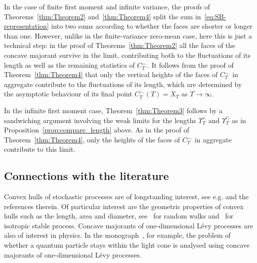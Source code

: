 \documentclass[AHL,Unicode,longabstracts,published]{cedram}
\newcommand\1{\mathds{1}}
\begin{document}
In the case of finite first moment and infinite variance, the proofs of Theorems~\ref{thm:Theorem2} and~\ref{thm:Theorem4} split the sum in~\eqref{eq:SB-representation} into two sums according to whether the faces are shorter or longer than one. However, unlike in the finite-variance zero-mean case, here this is just a technical step: in the proof of Theorems~\ref{thm:Theorem2} all the faces of the concave majorant survive in the limit, contributing both to the fluctuations of its length as well as the remaining statistics of $C_T^\frown$. It follows from the proof of Theorem~\ref{thm:Theorem4} that only the vertical heights of the faces of $C_T^\frown$ in aggregate contribute to the fluctuations of its length, which are determined by the asymptotic behaviour of its final point $C_T^\frown(T)=X_T$ as $T\to\infty$.

In the infinite first moment case, Theorem~\ref{thm:Theorem3} follows by a sandwiching argument involving the weak limits for the lengths $\Upsilon_T^\wedge$ and $\Upsilon_T^\sqcap$ as in Proposition~\ref{prop:compare_length} above. As in the proof of Theorem~\ref{thm:Theorem4}, only the heights of the faces of $C_T^\frown$ in aggregate contribute to this limit.

\subsection{Connections with the literature}\label{subsec:lit}
Convex hulls of stochastic processes are of longstanding interest, see e.g.\:\!\cite{PitmanBravoCMLP} and the references therein. Of particular interest are the geometric properties of convex hulls such as the length, area and diameter, see~\cite{RWpaper,MR3896868,randonfurling2020convex,MR3272767,MR3385604} for random walks and~\cite{MR2898714} for isotropic stable process. Concave majorants of one-dimensional Lévy processes are also of interest in physics. In the monograph~\cite[Chapter~XI]{MR1739699}, for example, the problem of whether a quantum particle stays within the light cone is analysed using concave majorants of one-dimensional Lévy processes.
\end{document}
